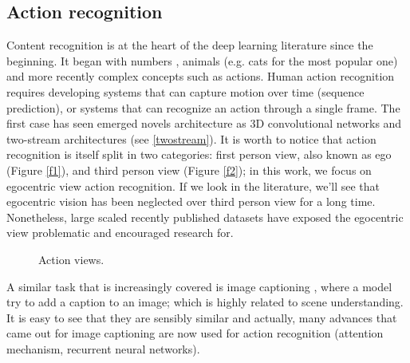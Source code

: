 \documentclass[12pt, a4paper]{report}
\begin{document}
			\subsection*{Action recognition}
			Content recognition is at the heart of the deep learning literature since the beginning. It began with numbers \cite{neocognitron,lecun_98}, animals (e.g. cats for the most popular one) and more recently complex concepts such as actions.
			Human action recognition requires developing systems that can capture motion over time (sequence prediction), or systems that can recognize an action through a single frame.
			The first case has seen emerged novels architecture as 3D convolutional networks \cite{ji} and two-stream architectures \cite{sudhakaran, wang, ye} (see \ref{twostream}).
			It is worth to notice that action recognition is itself split in two categories: first person view, also known as \gls{ego} (Figure \ref{f1}), and third person view (Figure \ref{f2}); in this work, we focus on egocentric view action recognition.
			If we look in the literature, we'll see that egocentric vision has been neglected over third person view for a long time.
			Nonetheless, large scaled recently published datasets have exposed the egocentric view problematic and encouraged research for.
			\begin{figure}[!h]
				\centering
				\hfill
				\caption{Action views.}
			\end{figure}
			A similar task that is increasingly covered is image captioning \cite{xu}, where a model try to add a caption to an image; which is highly related to scene understanding.
			It is easy to see that they are sensibly similar and actually, many advances that came out for image captioning are now used for action recognition (attention mechanism, recurrent neural networks).
\end{document}

